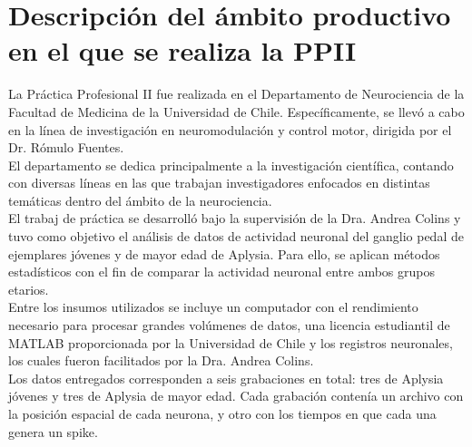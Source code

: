 \section{Descripción del ámbito productivo en el que se realiza la PPII }

La Práctica Profesional II fue realizada en el Departamento de Neurociencia de la Facultad de Medicina de la Universidad de Chile. Específicamente, se llevó a cabo en la línea de investigación en neuromodulación y control motor, dirigida por el Dr. Rómulo Fuentes.\\

El departamento se dedica principalmente a la investigación científica, contando con diversas líneas en las que trabajan investigadores enfocados en distintas temáticas dentro del ámbito de la neurociencia.\\

El trabaj de práctica se desarrolló bajo la supervisión de la Dra. Andrea Colins y tuvo como objetivo el análisis de datos de actividad neuronal del ganglio pedal de ejemplares jóvenes y de mayor edad de Aplysia. Para ello, se aplican métodos estadísticos con el fin de comparar la actividad neuronal entre ambos grupos etarios.\\

Entre los insumos utilizados se incluye un computador con el rendimiento necesario para procesar grandes volúmenes de datos, una licencia estudiantil de MATLAB proporcionada por la Universidad de Chile y los registros neuronales, los cuales fueron facilitados por la Dra. Andrea Colins.\\

Los datos entregados corresponden a seis grabaciones en total: tres de Aplysia jóvenes y tres de Aplysia de mayor edad. Cada grabación contenía un archivo con la posición espacial de cada neurona, y otro con los tiempos en que cada una genera un spike.\\
